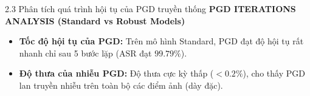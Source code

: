\documentclass[10pt, xcolor=table]{beamer}
\begin{document}
\begin{frame}{2.3 Phân tích quá trình hội tụ của PGD truyền thống}
    \centering
    \small \textbf{PGD ITERATIONS ANALYSIS (Standard vs Robust Models)}
    \vspace{0.1cm}
    
    \vspace{0.2cm}
    \begin{itemize}
        \item \textbf{Tốc độ hội tụ của PGD:} Trên mô hình Standard, PGD đạt độ hội tụ rất nhanh chỉ sau 5 bước lặp (ASR đạt $99.79\%$).
        \item \textbf{Độ thưa của nhiễu PGD:} Độ thưa cực kỳ thấp ($<0.2\%$), cho thấy PGD lan truyền nhiễu trên toàn bộ các điểm ảnh (dày đặc).
    \end{itemize}
\end{frame}
\end{document}
